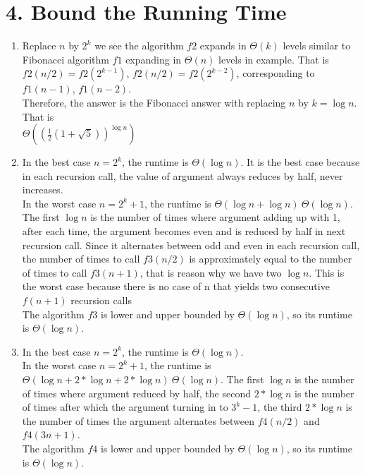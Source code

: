 \documentclass[11pt]{article}
\newenvironment{qparts}{\begin{enumerate}[{(}a{)}]}{\end{enumerate}}
\begin{document}
\section*{4. Bound the Running Time}
\begin{qparts}
\item
Replace $n$ by $2^k$ we see the algorithm $f2$ expands in $\Theta(k)$ levels similar to Fibonacci algorithm $f1$ expanding in $\Theta(n)$ levels in example. That is $f2(n/2)=f2(2^{k-1})$, $f2(n/2)=f2(2^{k-2})$, corresponding to $f1(n-1)$, $f1(n-2)$. \\
Therefore, the answer is the Fibonacci answer with replacing $n$ by $k=\log n$. That is\\ $\Theta\left(\left(\frac{1}{2}\left(1+\sqrt{5}\right)\right)^{\log n}\right)$

\item
In the best case $n = 2^k$, the runtime is $\Theta(\log n)$. It is the best case because in each recursion call, the value of argument always reduces by half, never increases.\\
In the worst case $n = 2^k + 1$, the runtime is $\Theta(\log n + \log n) ~ \Theta(\log n)$. The first $\log n$ is the number of times where argument adding up with 1, after each time, the argument becomes even and is reduced by half in next recursion call. Since it alternates between odd and even in each recursion call, the number of times to call $f3(n/2)$ is approximately equal to the number of times to call $f3(n + 1)$, that is reason why we have two $\log n$. This is the worst case because there is no case of n that yields two consecutive $f(n+1)$ recursion calls\\
The algorithm $f3$ is lower and upper bounded by $\Theta(\log n)$, so its runtime is $\Theta(\log n)$.

\item
In the best case $n = 2^k$, the runtime is $\Theta(\log n)$.\\
In the worst case $n = 2^k + 1$, the runtime is $\Theta(\log n + 2 * \log n + 2 * \log n) ~ \Theta(\log n)$. The first $\log n$ is the number of times where argument reduced by half, the second $2*\log n$ is the number of times after which the argument turning in to $3^k - 1$, the third $2*\log n$ is the number of times the argument alternates between $f4(n/2)$ and $f4(3n+1)$.\\
The algorithm $f4$ is lower and upper bounded by $\Theta(\log n)$, so its runtime is $\Theta(\log n)$.


\end{qparts}
\end{document}
